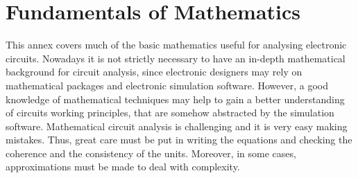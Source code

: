\chapter{Fundamentals of Mathematics}

\begin{summary}
This annex covers much of the basic mathematics useful for analysing electronic circuits. Nowadays it is not strictly necessary to have an in-depth mathematical background for circuit analysis, since electronic designers may rely on mathematical packages and electronic simulation software. However, a good knowledge of mathematical techniques may help to gain a better understanding of circuits working principles, that are somehow abstracted by the simulation software.
Mathematical circuit analysis is challenging and it is very easy making mistakes. Thus, great care must be put in writing the equations and checking the coherence and the consistency of the units. Moreover, in some cases, approximations must be made to deal with complexity.
\end{summary}

